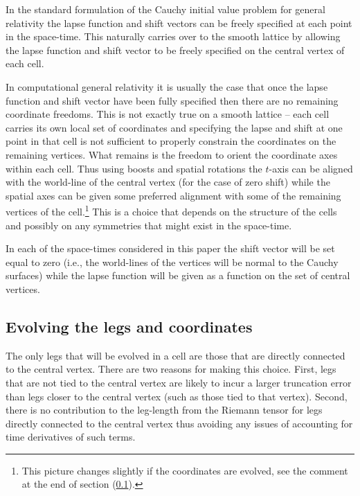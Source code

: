 \documentclass[a4paper,12pt]{article}
\numberwithin{equation}{section}
\begin{document}
In the standard formulation of the Cauchy initial value problem for general relativity the
lapse function and shift vectors can be freely specified at each point in the space-time.
This naturally carries over to the smooth lattice by allowing the lapse function and shift
vector to be freely specified on the central vertex of each cell.

In computational general relativity it is usually the case that once the lapse function and
shift vector have been fully specified then there are no remaining coordinate freedoms. This
is not exactly true on a smooth lattice -- each cell carries its own local set of coordinates
and specifying the lapse and shift at one point in that cell is not sufficient to properly
constrain the coordinates on the remaining vertices. What remains is the freedom to orient
the coordinate axes within each cell. Thus using boosts and spatial rotations the $t$-axis
can be aligned with the world-line of the central vertex (for the case of zero shift) while
the spatial axes can be given some preferred alignment with some of the remaining vertices of
the cell.\footnote{This picture changes slightly if the coordinates are evolved, see the
comment at the end of section (\ref{sec:DotLegs}).} This is a choice that depends on the
structure of the cells and possibly on any symmetries that might exist in the space-time.

In each of the space-times considered in this paper the shift vector will be set equal to
zero (i.e., the world-lines of the vertices will be normal to the Cauchy surfaces) while the
lapse function will be given as a function on the set of central vertices.

\subsection{Evolving the legs and coordinates}
\label{sec:DotLegs}

The only legs that will be evolved in a cell are those that are directly connected to the
central vertex. There are two reasons for making this choice. First, legs that are not tied
to the central vertex are likely to incur a larger truncation error than legs closer to the
central vertex (such as those tied to that vertex). Second, there is no contribution to the
leg-length from the Riemann tensor for legs directly connected to the central vertex thus
avoiding any issues of accounting for time derivatives of such terms.
\end{document}
